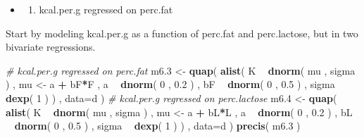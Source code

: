 \documentclass[
]{article}
\newenvironment{Shaded}{\begin{snugshade}}{\end{snugshade}}
\newcommand{\CommentTok}[1]{\textcolor[rgb]{0.56,0.35,0.01}{\textit{#1}}}
\newcommand{\DataTypeTok}[1]{\textcolor[rgb]{0.13,0.29,0.53}{#1}}
\newcommand{\DecValTok}[1]{\textcolor[rgb]{0.00,0.00,0.81}{#1}}
\newcommand{\FloatTok}[1]{\textcolor[rgb]{0.00,0.00,0.81}{#1}}
\newcommand{\KeywordTok}[1]{\textcolor[rgb]{0.13,0.29,0.53}{\textbf{#1}}}
\newcommand{\NormalTok}[1]{#1}
\newcommand{\OperatorTok}[1]{\textcolor[rgb]{0.81,0.36,0.00}{\textbf{#1}}}
\newcommand{\StringTok}[1]{\textcolor[rgb]{0.31,0.60,0.02}{#1}}
\providecommand{\tightlist}{%
  \setlength{\itemsep}{0pt}\setlength{\parskip}{0pt}}
\begin{document}
\begin{Shaded}
\end{Shaded}

\begin{itemize}
\item
  \begin{enumerate}
  \def\labelenumi{\arabic{enumi}.}
  \tightlist
  \item
    kcal.per.g regressed on perc.fat
  \end{enumerate}
\end{itemize}

Start by modeling kcal.per.g as a function of perc.fat and perc.lactose,
but in two bivariate regressions.

\begin{Shaded}
\begin{Highlighting}[]
\CommentTok{# kcal.per.g regressed on perc.fat}
\NormalTok{m6}\FloatTok{.3}\NormalTok{ <-}\StringTok{ }\KeywordTok{quap}\NormalTok{(}
    \KeywordTok{alist}\NormalTok{(}
\NormalTok{        K }\OperatorTok{~}\StringTok{ }\KeywordTok{dnorm}\NormalTok{( mu , sigma ) ,}
\NormalTok{        mu <-}\StringTok{ }\NormalTok{a }\OperatorTok{+}\StringTok{ }\NormalTok{bF}\OperatorTok{*}\NormalTok{F ,}
\NormalTok{        a }\OperatorTok{~}\StringTok{ }\KeywordTok{dnorm}\NormalTok{( }\DecValTok{0}\NormalTok{ , }\FloatTok{0.2}\NormalTok{ ) ,}
\NormalTok{        bF }\OperatorTok{~}\StringTok{ }\KeywordTok{dnorm}\NormalTok{( }\DecValTok{0}\NormalTok{ , }\FloatTok{0.5}\NormalTok{ ) ,}
\NormalTok{        sigma }\OperatorTok{~}\StringTok{ }\KeywordTok{dexp}\NormalTok{( }\DecValTok{1}\NormalTok{ )}
\NormalTok{) , }\DataTypeTok{data=}\NormalTok{d )}
\CommentTok{# kcal.per.g regressed on perc.lactose}
\NormalTok{m6}\FloatTok{.4}\NormalTok{ <-}\StringTok{ }\KeywordTok{quap}\NormalTok{(}
    \KeywordTok{alist}\NormalTok{(}
\NormalTok{        K }\OperatorTok{~}\StringTok{ }\KeywordTok{dnorm}\NormalTok{( mu , sigma ) ,}
\NormalTok{        mu <-}\StringTok{ }\NormalTok{a }\OperatorTok{+}\StringTok{ }\NormalTok{bL}\OperatorTok{*}\NormalTok{L ,}
\NormalTok{        a }\OperatorTok{~}\StringTok{ }\KeywordTok{dnorm}\NormalTok{( }\DecValTok{0}\NormalTok{ , }\FloatTok{0.2}\NormalTok{ ) ,}
\NormalTok{        bL }\OperatorTok{~}\StringTok{ }\KeywordTok{dnorm}\NormalTok{( }\DecValTok{0}\NormalTok{ , }\FloatTok{0.5}\NormalTok{ ) ,}
\NormalTok{        sigma }\OperatorTok{~}\StringTok{ }\KeywordTok{dexp}\NormalTok{( }\DecValTok{1}\NormalTok{ )}
\NormalTok{) , }\DataTypeTok{data=}\NormalTok{d )}
\KeywordTok{precis}\NormalTok{( m6}\FloatTok{.3}\NormalTok{ )}
\end{Highlighting}
\end{Shaded}
\end{document}
